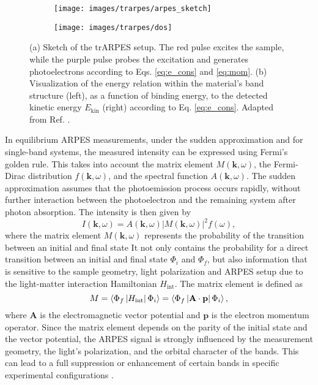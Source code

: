 \begin{figure}
	\centering
	\begin{subfigure}[b]{0.49\textwidth}
		\texttt{[image: images/trarpes/arpes\_sketch]}
		\caption{}
	\end{subfigure}
	\hfill
	\begin{subfigure}[b]{0.4\textwidth}
		\texttt{[image: images/trarpes/dos]}
		\caption{}
	\end{subfigure}
	\caption{(a) Sketch of the trARPES setup. The red pulse excites the sample, while the purple pulse probes the excitation and generates photoelectrons according to Eqs. \ref{eq:e_cons} and \ref{eq:mom}. (b) Visualization of the energy relation within the material’s band structure (left), as a function of binding energy, to the detected kinetic energy $E_\text{kin}$ (right) according to Eq. \ref{eq:e_cons}. Adapted from Ref. \cite{hufner_photoelectron_1995}.}
	\label{fig:arpes_sketch}
\end{figure}

In equilibrium ARPES measurements, under the sudden approximation and for single-band systems, the measured intensity can be expressed using Fermi's golden rule.
This takes into account the matrix element $M(\mathbf{k}, \omega)$, the Fermi-Dirac distribution $f(\mathbf{k}, \omega)$, and the spectral function $A(\mathbf{k}, \omega)$.
The sudden approximation assumes that the photoemission process occurs rapidly, without further interaction between the photoelectron and the remaining system after photon absorption.
The intensity is then given by
\begin{equation}
	I(\mathbf{k}, \omega) = A(\mathbf{k}, \omega)\left|M(\mathbf{k}, \omega)\right|^2f(\omega),
	\label{eq:spectral}
\end{equation}
where the matrix element $M(\mathbf{k}, \omega)$ represents the probability of the transition between an initial and final state
It not only contains the probability for a direct transition between an initial and final state $\Phi_i$ and $\Phi_f$, but also information that is sensitive to the sample geometry, light polarization and ARPES setup due to the light-matter interaction Hamiltonian $H_\text{int}$.
The matrix element is defined as
\begin{equation}
	M = \braket{\Phi_f\left|H_\text{int}\right|\Phi_i} = \braket{\Phi_f\left| \mathbf{A} \cdot \mathbf{p} \right|\Phi_i},
\end{equation}
where $\mathbf{A}$ is the electromagnetic vector potential and $\mathbf{p}$ is the electron momentum operator.
Since the matrix element depends on the parity of the initial state and the vector potential, the ARPES signal is strongly influenced by the measurement geometry, the light's polarization, and the orbital character of the bands.
This can lead to a full suppression or enhancement of certain bands in specific experimental configurations \cite{gierz_illuminating_2011, cao_mapping_2013,zhu_layer-by-layer_2013,schuler_polarization-modulated_2022}.


